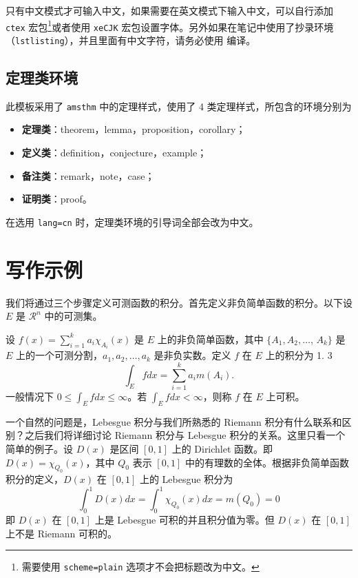 \documentclass[cn,blue,12pt,normal]{elegantnote}
\begin{document}
\begin{note}
只有中文模式才可输入中文，如果需要在英文模式下输入中文，可以自行添加 \lstinline{ctex} 宏包\footnote{需要使用 \lstinline{scheme=plain} 选项才不会把标题改为中文。}或者使用 \lstinline{xeCJK} 宏包设置字体。另外如果在笔记中使用了抄录环境（\lstinline{lstlisting}），并且里面有中文字符，请务必使用  编译。
\end{note}


\subsection{定理类环境}

此模板采用了 \lstinline{amsthm} 中的定理样式，使用了 4 类定理样式，所包含的环境分别为
\begin{itemize}
  \item \textbf{定理类}：theorem，lemma，proposition，corollary；
  \item \textbf{定义类}：definition，conjecture，example；
  \item \textbf{备注类}：remark，note，case；
  \item \textbf{证明类}：proof。
\end{itemize}

\begin{remark}
在选用 \lstinline{lang=cn} 时，定理类环境的引导词全部会改为中文。
\end{remark}


\section{写作示例}

我们将通过三个步骤定义可测函数的积分。首先定义非负简单函数的积分。以下设 $E$ 是 $\mathcal{R}^n$ 中的可测集。

\begin{definition}[可积性]
设 $ f(x)=\sum\limits_{i=1}^{k} a_i \chi_{A_i}(x)$ 是 $E$ 上的非负简单函数，其中 $\{A_1,A_2,\ldots$, $A_k\}$ 是 $E$ 上的一个可测分割，$a_1,a_2,\ldots,a_k$ 是非负实数。定义 $f$ 在 $E$ 上的积分为 1. 3
\begin{equation}
   \label{inter}
   \int_{E} f dx = \sum_{i=1}^k a_i m(A_i).
\end{equation}
一般情况下 $0 \leq \int_{E} f dx \leq \infty$。若 $\int_{E} f dx < \infty$，则称 $f$ 在 $E$ 上可积。
\end{definition}

一个自然的问题是，Lebesgue 积分与我们所熟悉的 Riemann 积分有什么联系和区别？之后我们将详细讨论 Riemann 积分与 Lebesgue 积分的关系。这里只看一个简单的例子。设 $D(x)$ 是区间 $[0,1]$ 上的 Dirichlet 函数。即 $D(x)=\chi_{Q_0}(x)$，其中 $Q_0$ 表示 $[0,1]$ 中的有理数的全体。根据非负简单函数积分的定义，$D(x)$ 在 $[0,1]$ 上的 Lebesgue 积分为
\begin{equation}\label{inter2}
  \int_0^1 D(x)dx = \int_0^1 \chi_{Q_0} (x) dx = m(Q_0) = 0
\end{equation}
即 $D(x)$ 在 $[0,1]$ 上是 Lebesgue 可积的并且积分值为零。但 $D(x)$ 在 $[0,1]$ 上不是 Riemann 可积的。
\end{document}
